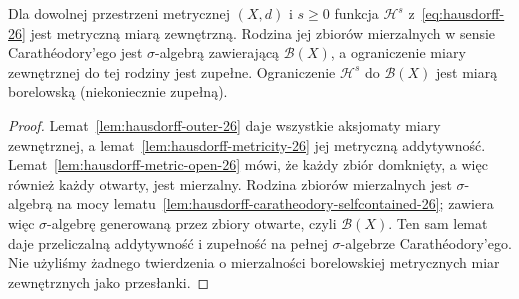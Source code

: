 \begin{twierdzenie}
\label{thm:hausdorff-borel-26}
Dla dowolnej przestrzeni metrycznej $(X,d)$ i $s\geq0$
funkcja $\mathcal H^s$ z~\eqref{eq:hausdorff-26}
jest metryczną miarą zewnętrzną. Rodzina jej zbiorów
mierzalnych w sensie Carathéodory'ego jest
$\sigma$-algebrą zawierającą $\mathcal B(X)$,
a ograniczenie miary zewnętrznej do tej rodziny jest zupełne.
Ograniczenie $\mathcal H^s$ do $\mathcal B(X)$ jest
miarą borelowską (niekoniecznie zupełną).
\end{twierdzenie}
\begin{proof}
Lemat~\ref{lem:hausdorff-outer-26} daje
wszystkie aksjomaty miary zewnętrznej,
a lemat~\ref{lem:hausdorff-metricity-26}
jej metryczną addytywność.
Lemat~\ref{lem:hausdorff-metric-open-26} mówi, że
każdy zbiór domknięty, a więc również każdy otwarty,
jest mierzalny. Rodzina zbiorów mierzalnych jest
$\sigma$-algebrą na mocy
lematu~\ref{lem:hausdorff-caratheodory-selfcontained-26};
zawiera więc $\sigma$-algebrę generowaną przez
zbiory otwarte, czyli $\mathcal B(X)$.
Ten sam lemat daje przeliczalną addytywność
i zupełność na pełnej $\sigma$-algebrze
Carathéodory'ego. Nie użyliśmy żadnego twierdzenia
o mierzalności borelowskiej metrycznych miar zewnętrznych
jako przesłanki.
\end{proof}



